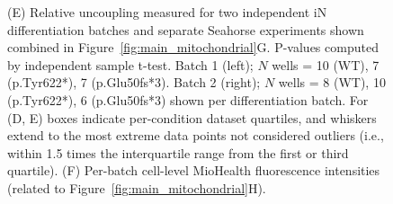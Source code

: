 \begin{figure}[ht]
{         (E) Relative uncoupling measured for two independent iN differentiation batches and separate Seahorse experiments shown combined in Figure~\ref{fig:main_mitochondrial}G. P-values computed by independent sample t-test. Batch 1 (left); $N$ wells = 10 (WT), 7 (p.Tyr622*), 7 (p.Glu50fs*3). Batch 2 (right); $N$ wells = 8 (WT), 10 (p.Tyr622*), 6 (p.Glu50fs*3) shown per differentiation batch. For (D, E) boxes indicate per-condition dataset quartiles, and whiskers extend to the most extreme data points not considered outliers (i.e., within 1.5 times the interquartile range from the first or third quartile). 
         (F) Per-batch cell-level MioHealth fluorescence intensities (related to Figure~\ref{fig:main_mitochondrial}H).
     }
     \label{fig:oxygen_consumption_rates_iPSC_neurons}
 \end{figure}